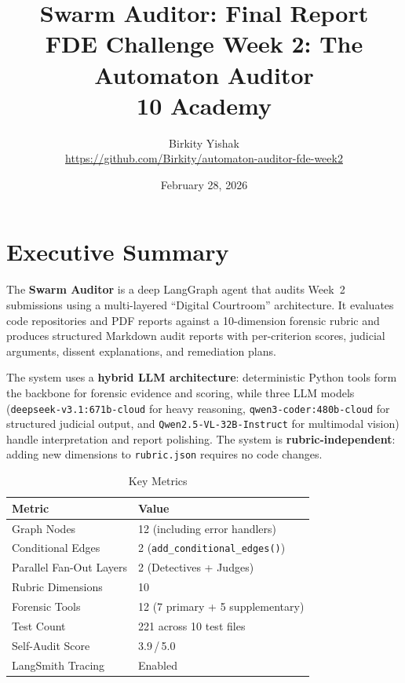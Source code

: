 \documentclass[11pt,a4paper]{article}
\title{%
    \vspace{-1cm}
    \textbf{Swarm Auditor: Final Report}\\[0.3cm]
    \large FDE Challenge Week 2: The Automaton Auditor\\[0.2cm]
    \normalsize 10 Academy
}
\author{
    Birkity Yishak\\
    \small \url{https://github.com/Birkity/automaton-auditor-fde-week2}
}
\date{February 28, 2026}
\begin{document}
\maketitle
\thispagestyle{fancy}

\section{Executive Summary}

The \textbf{Swarm Auditor} is a deep LangGraph agent that audits Week~2 submissions
using a multi-layered ``Digital Courtroom'' architecture.  It evaluates code
repositories and PDF reports against a 10-dimension forensic rubric and produces
structured Markdown audit reports with per-criterion scores, judicial arguments,
dissent explanations, and remediation plans.

The system uses a \textbf{hybrid LLM architecture}: deterministic Python tools
form the backbone for forensic evidence and scoring, while three LLM models
(\texttt{deepseek-v3.1:671b-cloud} for heavy reasoning,
\texttt{qwen3-coder:480b-cloud} for structured judicial output, and
\texttt{Qwen2.5-VL-32B-Instruct} for multimodal vision) handle interpretation
and report polishing.  The system is \textbf{rubric-independent}: adding new
dimensions to \texttt{rubric.json} requires no code changes.

\begin{table}[H]
\centering
\caption{Key Metrics}
\begin{tabular}{@{}ll@{}}
\toprule
\textbf{Metric} & \textbf{Value} \\
\midrule
Graph Nodes            & 12 (including error handlers) \\
Conditional Edges      & 2 (\texttt{add\_conditional\_edges()}) \\
Parallel Fan-Out Layers & 2 (Detectives + Judges) \\
Rubric Dimensions      & 10 \\
Forensic Tools         & 12 (7 primary + 5 supplementary) \\
Test Count             & 221 across 10 test files \\
Self-Audit Score       & 3.9\,/\,5.0 \\
LangSmith Tracing      & Enabled \\
\bottomrule
\end{tabular}
\end{table}
\end{document}
